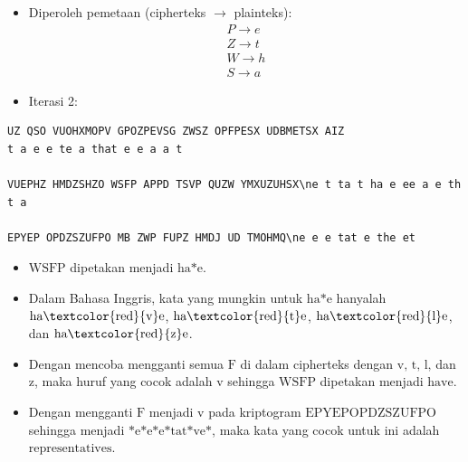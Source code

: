 \documentclass{article}
\begin{document}
\newpage


\begin{itemize}
    \item Diperoleh pemetaan (cipherteks $\rightarrow$ plainteks):
    \[
    \begin{aligned}
    P \rightarrow e \\ 
    Z \rightarrow t \\ 
    W \rightarrow h \\ 
    S \rightarrow a
    \end{aligned}
    \]
    \item Iterasi 2:
\end{itemize}

\vspace{5mm}

\begin{verbatim}
UZ QSO VUOHXMOPV GPOZPEVSG ZWSZ OPFPESX UDBMETSX AIZ
t a e e te a that e e a a t

VUEPHZ HMDZSHZO WSFP APPD TSVP QUZW YMXUZUHSX\ne t ta t ha e ee a e th t a

EPYEP OPDZSZUFPO MB ZWP FUPZ HMDJ UD TMOHMQ\ne e e tat e the et
\end{verbatim}

\newpage


\begin{itemize}
    \item $\text{WSFP}$ dipetakan menjadi $\text{ha*e}$.
    \item Dalam Bahasa Inggris, kata yang mungkin untuk $\text{ha*e}$ hanyalah $\text{ha\textcolor{red}{v}e}$, $\text{ha\textcolor{red}{t}e}$, $\text{ha\textcolor{red}{l}e}$, dan $\text{ha\textcolor{red}{z}e}$.
    \item Dengan mencoba mengganti semua $\text{F}$ di dalam cipherteks dengan $\text{v, t, l,}$ dan $\text{z}$, maka huruf yang cocok adalah $\text{v}$ sehingga $\text{WSFP}$ dipetakan menjadi $\text{have}$.
    \item Dengan mengganti $\text{F}$ menjadi $\text{v}$ pada kriptogram $\text{EPYEPOPDZSZUFPO}$ sehingga menjadi $\text{*e*e*e*tat*ve*}$, maka kata yang cocok untuk ini adalah $\text{representatives}$.
\end{itemize}

\newpage

\end{document}
